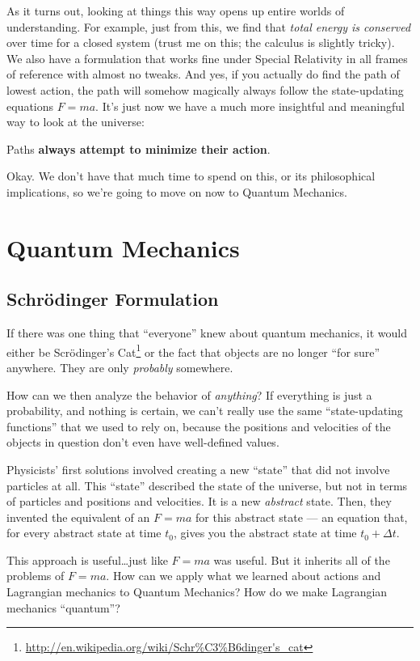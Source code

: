 \documentclass[]{article}
\renewcommand{\href}[2]{#2\footnote{\url{#1}}}
\begin{document}
As it turns out, looking at things this way opens up entire worlds of
understanding. For example, just from this, we find that \emph{total energy is
conserved} over time for a closed system (trust me on this; the calculus is
slightly tricky). We also have a formulation that works fine under Special
Relativity in all frames of reference with almost no tweaks. And yes, if you
actually do find the path of lowest action, the path will somehow magically
always follow the state-updating equations \(F = m a\). It's just now we have a
much more insightful and meaningful way to look at the universe:

Paths \textbf{always attempt to minimize their action}.

Okay. We don't have that much time to spend on this, or its philosophical
implications, so we're going to move on now to Quantum Mechanics.

\section{Quantum Mechanics}\label{quantum-mechanics}

\subsection{Schrödinger Formulation}\label{schruxf6dinger-formulation}

If there was one thing that ``everyone'' knew about quantum mechanics, it would
either be
\href{http://en.wikipedia.org/wiki/Schr\%C3\%B6dinger's_cat}{Scrödinger's Cat}
or the fact that objects are no longer ``for sure'' anywhere. They are only
\emph{probably} somewhere.

How can we then analyze the behavior of \emph{anything}? If everything is just a
probability, and nothing is certain, we can't really use the same
``state-updating functions'' that we used to rely on, because the positions and
velocities of the objects in question don't even have well-defined values.

Physicists' first solutions involved creating a new ``state'' that did not
involve particles at all. This ``state'' described the state of the universe,
but not in terms of particles and positions and velocities. It is a new
\emph{abstract} state. Then, they invented the equivalent of an \(F = m a\) for
this abstract state --- an equation that, for every abstract state at time
\(t_0\), gives you the abstract state at time \(t_0 + \Delta t\).

This approach is useful\ldots just like \(F = m a\) was useful. But it inherits
all of the problems of \(F = m a\). How can we apply what we learned about
actions and Lagrangian mechanics to Quantum Mechanics? How do we make Lagrangian
mechanics ``quantum''?
\end{document}
